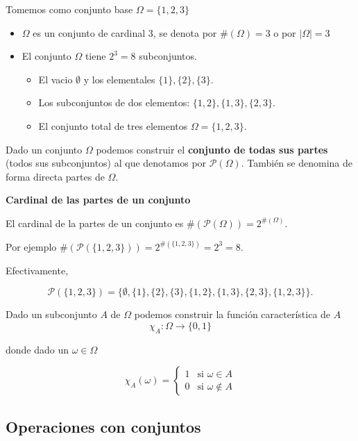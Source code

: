 \documentclass[]{book}
\providecommand{\tightlist}{%
  \setlength{\itemsep}{0pt}\setlength{\parskip}{0pt}}
\begin{document}
Tomemos como conjunto base \(\Omega=\{1,2,3\}\)

\begin{itemize}
\tightlist
\item
  \(\Omega\) es un conjunto de cardinal 3, se denota por \(\#(\Omega)=3\) o por \(|\Omega|=3\)
\item
  El conjunto \(\Omega\) tiene \(2^3=8\) subconjuntos.

  \begin{itemize}
  \tightlist
  \item
    El vacio \(\emptyset\) y los elementales \(\{1\},\{2\},\{3\}\).
  \item
    Los subconjuntos de dos elementos: \(\{1,2\},\{1,3\},\{2,3\}\).
  \item
    El conjunto total de tres elementos \(\Omega=\{1,2,3\}.\)
  \end{itemize}
\end{itemize}

Dado un conjunto \(\Omega\) podemos construir el \textbf{conjunto de todas sus partes} (todos sus subconjuntos) al que denotamos por \(\mathcal{P}(\Omega)\). También se denomina de forma directa partes de \(\Omega\).

 \textbf{Cardinal de las partes de un conjunto}

El cardinal de la partes de un conjunto es \(\#(\mathcal{P}(\Omega))=2^{\#(\Omega)}.\)

Por ejemplo \(\#\left(\mathcal{P}(\{1,2,3\})\right)=2^{\#(\{1,2,3\})}=2^3=8.\)

Efectivamente,

\[\mathcal{P}(\{1,2,3\})=\{\emptyset,\{1\},\{2\},\{3\},\{1,2\},\{1,3\},\{2,3\},\{1,2,3\}\}.\]

Dado un subconjunto \(A\) de \(\Omega\) podemos construir la función característica de \(A\)
\[\chi_A:\Omega \to \{0,1\}\]

donde dado un \(\omega\in \Omega\)

\[
\chi_A(\omega)=
\left\{
\begin{array}{ll}
1 &  \mbox{si }\omega \in A\\
0 &  \mbox{si }\omega \not\in A
\end{array}
\right.
\]

\hypertarget{operaciones-con-conjuntos}{%
\subsection{Operaciones con conjuntos}\label{operaciones-con-conjuntos}}
\end{document}

